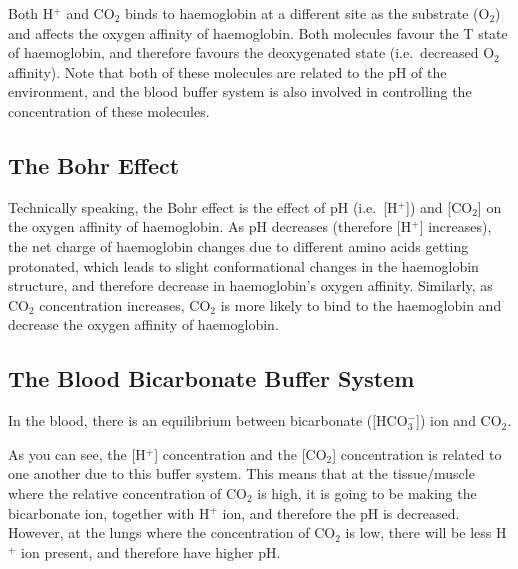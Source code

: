 Both H$^+$ and CO$_2$ binds to haemoglobin at a different site as the substrate (O$_2$) and affects the oxygen affinity of haemoglobin.
Both molecules favour the T state of haemoglobin, and therefore favours the deoxygenated state (i.e.\  decreased O$_2$ affinity).
Note that both of these molecules are related to the pH of the environment, and the blood buffer system is also involved in controlling the concentration of these molecules.

\subsection{The Bohr Effect}

Technically speaking, the Bohr effect is the effect of pH (i.e.\  [H$^+$]) and [CO$_2$] on the oxygen affinity of haemoglobin.
As pH decreases (therefore [H$^+$] increases), the net charge of haemoglobin changes due to different amino acids getting protonated, which leads to slight conformational changes in the haemoglobin structure, and therefore decrease in haemoglobin's oxygen affinity.
Similarly, as CO$_2$ concentration increases, CO$_2$ is more likely to bind to the haemoglobin and decrease the oxygen affinity of haemoglobin.

\begin{center}
\end{center}

\subsection{The Blood Bicarbonate Buffer System}

In the blood, there is an equilibrium between bicarbonate ([HCO$_3^-$]) ion and CO$_2$.

\begin{center}
\end{center}

As you can see, the [H$^+$] concentration and the [CO$_2$] concentration is related to one another due to this buffer system.
This means that at the tissue/muscle where the relative concentration of CO$_2$ is high, it is going to be making the bicarbonate ion, together with H$^+$ ion, and therefore the pH is decreased.
However, at the lungs where the concentration of CO$_2$ is low, there will be less H$^+$ ion present, and therefore have higher pH.


